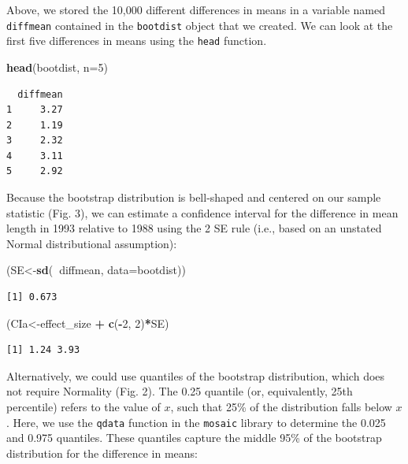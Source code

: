 \documentclass[fleqn,10pt]{wlpeerj} %
\newenvironment{Shaded}{\begin{snugshade}}{\end{snugshade}}
\newcommand{\DataTypeTok}[1]{\textcolor[rgb]{0.13,0.29,0.53}{#1}}
\newcommand{\DecValTok}[1]{\textcolor[rgb]{0.00,0.00,0.81}{#1}}
\newcommand{\KeywordTok}[1]{\textcolor[rgb]{0.13,0.29,0.53}{\textbf{#1}}}
\newcommand{\NormalTok}[1]{#1}
\newcommand{\OperatorTok}[1]{\textcolor[rgb]{0.81,0.36,0.00}{\textbf{#1}}}
\newcommand{\StringTok}[1]{\textcolor[rgb]{0.31,0.60,0.02}{#1}}
\begin{document}
Above, we stored the 10,000 different differences in means in a variable named
\texttt{diffmean} contained in the \texttt{bootdist} object that we created. We can look at the first five differences in means using the \texttt{head} function.

\begin{Shaded}
\begin{Highlighting}[]
\KeywordTok{head}\NormalTok{(bootdist, }\DataTypeTok{n=}\DecValTok{5}\NormalTok{)}
\end{Highlighting}
\end{Shaded}

\begin{verbatim}
  diffmean
1     3.27
2     1.19
3     2.32
4     3.11
5     2.92
\end{verbatim}

Because the bootstrap distribution is bell-shaped and centered on our sample statistic (Fig. 3), we can estimate a confidence interval for the difference in mean length in 1993 relative to 1988 using the 2 SE rule (i.e., based on an unstated Normal distributional assumption):

\begin{Shaded}
\begin{Highlighting}[]
\NormalTok{(SE<-}\KeywordTok{sd}\NormalTok{(}\OperatorTok{~}\NormalTok{diffmean, }\DataTypeTok{data=}\NormalTok{bootdist))}
\end{Highlighting}
\end{Shaded}

\begin{verbatim}
[1] 0.673
\end{verbatim}

\begin{Shaded}
\begin{Highlighting}[]
\NormalTok{(CIa<-effect_size }\OperatorTok{+}\StringTok{ }\KeywordTok{c}\NormalTok{(}\OperatorTok{-}\DecValTok{2}\NormalTok{, }\DecValTok{2}\NormalTok{)}\OperatorTok{*}\NormalTok{SE)}
\end{Highlighting}
\end{Shaded}

\begin{verbatim}
[1] 1.24 3.93
\end{verbatim}

Alternatively, we could use quantiles of the bootstrap distribution, which does not require Normality (Fig. 2). The 0.25 quantile (or, equivalently, 25th percentile) refers to the value of \(x\), such that 25\% of the distribution falls below \(x\). Here, we use the \texttt{qdata} function in the \texttt{mosaic} library to determine the 0.025 and 0.975 quantiles. These quantiles capture the middle 95\% of the bootstrap distribution for the difference in means:
\end{document}
